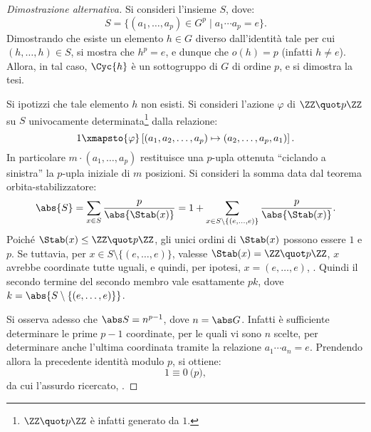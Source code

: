 \documentclass[12pt]{scrartcl}
\begin{document}
	\begin{proof}[Dimostrazione alternativa]
		Si consideri l'insieme $S$, dove:
		\[ S = \{ (a_1, \ldots, a_p) \in G^p \mid a_1 \cdots a_p = e \}. \]
		Dimostrando che esiste un elemento $h \in G$ diverso dall'identità tale
		per cui $(h, \ldots, h) \in S$, si mostra che $h^p = e$, e dunque che
		$o(h) = p$ (infatti $h \neq e$). Allora, in tal caso, $\Cyc{h}$ è
		un sottogruppo di $G$ di ordine $p$, e si dimostra la tesi. \medskip
		
		
		Si ipotizzi che tale elemento $h$ non esisti. Si consideri l'azione $\varphi$
		di $\ZZ \quot p\ZZ$ su $S$ univocamente determinata\footnote{$\ZZ \quot p\ZZ$ è infatti generato da $1$.} dalla relazione:
		\[ 1 \xmapsto{\varphi} \left[ (a_1, a_2, \ldots, a_p) \mapsto (a_2, \ldots, a_p, a_1) \right]. \]
		In particolare $m \cdot (a_1, \ldots, a_p)$ restituisce una $p$-upla ottenuta
		``ciclando a sinistra'' la $p$-upla iniziale di $m$ posizioni. Si consideri la
		somma data dal teorema orbita-stabilizzatore:
		\[ \abs{S} = \sum_{x \in S} \frac{p}{\abs{\Stab(x)}} = 1 + \sum_{x \in S \setminus \{(e,\ldots,e)\}} \frac{p}{\abs{\Stab(x)}}. \]
		Poiché $\Stab(x) \leq \ZZ \quot p\ZZ$, gli unici ordini di $\Stab(x)$ possono
		essere $1$ e $p$. Se tuttavia, per $x \in S \setminus \{(e,\ldots,e)\}$,
		valesse $\Stab(x) = \ZZ \quot p\ZZ$, $x$ avrebbe coordinate tutte uguali,
		e quindi, per ipotesi, $x = (e,\ldots,e)$, \Lightning. Quindi il secondo
		termine del secondo membro vale esattamente $pk$, dove $k = \abs{S \setminus \{(e,\ldots,e)\}}$. \medskip
		
		
		Si osserva adesso che $\abs S = n^{p-1}$, dove $n = \abs G$. Infatti è sufficiente
		determinare le prime $p-1$ coordinate, per le quali vi sono $n$ scelte, per determinare
		anche l'ultima coordinata tramite la relazione $a_1 \cdots a_n = e$. Prendendo
		allora la precedente identità modulo $p$, si ottiene:
		\[ 1 \equiv 0 \pod p, \]
		da cui l'assurdo ricercato, \Lightning.
	\end{proof}
\end{document}
